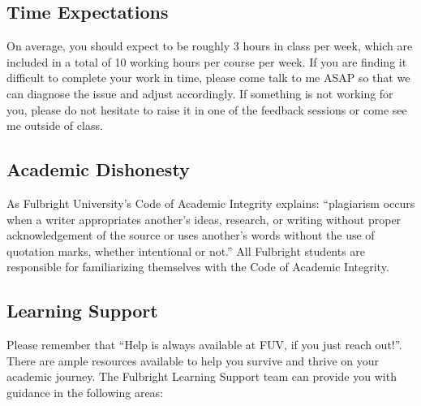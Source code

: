 \documentclass[
]{article}
\begin{document}
\subsection*{Time Expectations}\label{time-expectations}

On average, you should expect to be roughly 3 hours in class per week, which are included in a total of 10 working hours per course per week. If you are finding it difficult to complete your work in time, please come talk to me ASAP so that we can diagnose the issue and adjust accordingly. If something is not working for you, please do not hesitate to raise it in one of the feedback sessions or come see me outside of class.

\subsection*{Academic Dishonesty}\label{academic-dishonesty}

As Fulbright University's Code of Academic Integrity explains: ``plagiarism occurs when a writer appropriates another's ideas, research, or writing without proper acknowledgement of the source or uses another's words without the use of quotation marks, whether intentional or not.'' All Fulbright students are responsible for familiarizing themselves with the Code of Academic Integrity.

\subsection*{Learning Support}\label{learning-support}

Please remember that ``Help is always available at FUV, if you just reach out!''. There are ample resources available to help you survive and thrive on your academic journey. The Fulbright Learning Support team can provide you with guidance in the following areas:
\end{document}

